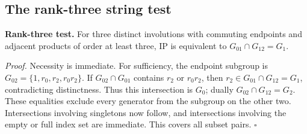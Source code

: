 \subsection*{The rank-three string test}
\textbf{Rank-three test.} For three distinct involutions with commuting
endpoints and adjacent products of order at least three, IP is equivalent
to \(G_{01}\cap G_{12}=G_1\).

\emph{Proof.} Necessity is immediate. For sufficiency, the endpoint subgroup
is \(G_{02}=\{1,r_0,r_2,r_0r_2\}\). If \(G_{02}\cap G_{01}\) contains
\(r_2\) or \(r_0r_2\), then \(r_2\in G_{01}\cap G_{12}=G_1\), contradicting
distinctness. Thus this intersection is \(G_0\); dually
\(G_{02}\cap G_{12}=G_2\). These equalities exclude every generator from
the subgroup on the other two. Intersections involving singletons now
follow, and intersections involving the empty or full index set are
immediate. This covers all subset pairs. \(\square\)
